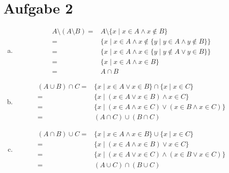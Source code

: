 \documentclass{scrreprt}
\begin{document}
	\section*{Aufgabe 2}
	\begin{enumerate}[a)]
		\item
			\begin{align*}
				A \setminus (A \setminus B) =& A \setminus \lbrace x \mid x \in A \land x \notin B\rbrace\\
				=& \lbrace x \mid x \in A \land x \notin \lbrace y \mid y \in A \land y \notin B \rbrace \rbrace\\
				=& \lbrace x \mid x \in A \land x \in \lbrace y \mid y \notin A \lor y \in B \rbrace \rbrace\\
				=& \lbrace x \mid x \in A \land x \in B\rbrace\\
				=& A \cap B
			\end{align*}
		\item
			\begin{align*}
				(A \cup B) \cap C = & \lbrace x \mid x \in A \lor x \in B \rbrace \cap \lbrace x \mid x \in C\rbrace\\
				= & \lbrace x \mid (x \in A \lor x \in B )\land x \in C\rbrace \\
				= & \lbrace x \mid (x \in A \land x \in C) \lor( x \in B \land x \in C)\rbrace \\
				= & (A \cap C) \cup (B \cap C)
			\end{align*}
		\item
			\begin{align*}
				(A \cap B) \cup C = & \lbrace x \mid x \in A \land x \in B \rbrace \cup \lbrace x \mid x \in C\rbrace\\
				= & \lbrace x \mid (x \in A \land x \in B )\lor x \in C\rbrace \\
				= & \lbrace x \mid (x \in A \lor x \in C) \land( x \in B \lor x \in C)\rbrace \\
				= & (A \cup C) \cap (B \cup C)
			\end{align*}
	\end{enumerate}

	\pagebreak
\end{document}
